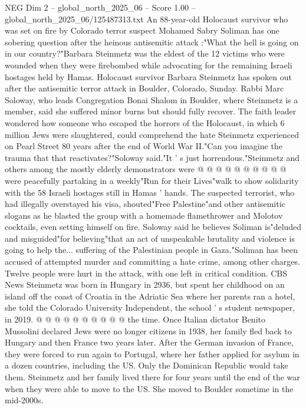 \begin{textsample}{NEG Dim 2 – global\_north\_2025\_06 – Score 1.00 – global\_north\_2025\_06/125487313.txt}  \label{ex:f2_neg_228}
An 88-year-old Holocaust survivor who was set on fire by Colorado terror suspect Mohamed Sabry Soliman has one sobering question after the heinous antisemitic attack :"What the hell is going on in our country?"Barbara Steinmetz was the eldest of the 12 victims who were wounded when they were firebombed while advocating for the remaining Israeli hostages held by Hamas.
Holocaust survivor Barbara Steinmetz has spoken out after the antisemitic terror attack in Boulder, Colorado, Sunday.
Rabbi Marc Soloway, who leads Congregation Bonai Shalom in Boulder, where Steinmetz is a member, said she suffered minor burns but should fully recover.
The faith leader wondered how someone who escaped the horrors of the Holocaust, in which 6 million Jews were slaughtered, could comprehend the hate Steinmetz experienced on Pearl Street 80 years after the end of World War II."Can you imagine the trauma that that reactivates?"Soloway said."It ' s just horrendous."Steinmetz and others among the mostly elderly demonstrators were @ @ @ @ @ @ @ @ @ @ were peacefully partaking in a weekly"Run for their Lives"walk to show solidarity with the 58 Israeli hostages still in Hamas ' hands.
The suspected terrorist, who had illegally overstayed his visa, shouted"Free Palestine"and other antisemitic slogans as he blasted the group with a homemade flamethrower and Molotov cocktails, even setting himself on fire.
Soloway said he believes Soliman is"deluded and misguided"for believing"that an act of unspeakable brutality and violence is going to help the... suffering of the Palestinian people in Gaza."Soliman has been accused of attempted murder and committing a hate crime, among other charges.
Twelve people were hurt in the attack, with one left in critical condition.
CBS News Steinmetz was born in Hungary in 2936, but spent her childhood on an island off the coast of Croatia in the Adriatic Sea where her parents ran a hotel, she told the Colorado University Independent, the school ' s student newspaper, in 2019. @ @ @ @ @ @ @ @ @ @ the time.
Once Italian dictator Benito Mussolini declared Jews were no longer citizens in 1938, her family fled back to Hungary and then France two years later.
After the German invasion of France, they were forced to run again to Portugal, where her father applied for asylum in a dozen countries, including the US.
Only the Dominican Republic would take them.
Steinmetz and her family lived there for four years until the end of the war when they were able to move to the US.
She moved to Boulder sometime in the mid-2000s.

\end{textsample}
